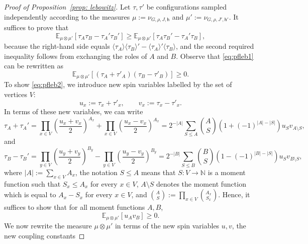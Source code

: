 \documentclass[10pt,a4paper]{amsart}
\begin{document}
\begin{proof}[Proof of Proposition~\textup{\ref{prop: lebowitz}}]
Let $\tau, \tau'$ be configurations sampled independently according to the measures $\mu:=\nu_{G,\rho,J,\mathsf{h}}$ and $\mu':=\nu_{G,\rho,J',\mathsf{h}'}$.
It suffices to prove that
\begin{equation}\label{eq:pfleb1}
\mathbb{E}_{\mu\otimes\mu'} [\tau_A\tau_B-\tau_A'\tau_B'] \ge \mathbb{E}_{\mu\otimes\mu'}[\tau_A\tau_B'-\tau_A'\tau_B],
\end{equation}
because the right-hand side equals $\langle \tau_A \rangle \langle\tau_B \rangle' - \langle \tau_A \rangle' \langle \tau_B \rangle$, and the second required inequality follows from exchanging the roles of $A$ and $B$.
Observe that \eqref{eq:pfleb1} can be rewritten as
\begin{equation}\label{eq:pfleb2}
\mathbb{E}_{\mu\otimes\mu'} [(\tau_A + \tau'_A)(\tau_B - \tau'_B)] \ge 0.
\end{equation}
To show \eqref{eq:pfleb2}, we introduce new spin variables labelled by the set of vertices $V$:
\begin{equation}
u_x := \tau_x + \tau'_x, \qquad v_x := \tau_x - \tau'_x.
\end{equation}
In terms of these new variables, we can write 
\begin{equation}
\tau_A+\tau_A' = \prod_{x\in V} \left(\frac{u_x+v_x}{2}\right)^{A_x} + \prod_{x\in V} \left(\frac{u_x-v_x}{2}\right)^{A_x}=2^{-|A|}\sum_{S\le A}\binom{A}{S}(1+(-1)^{|A|-|S|})u_S v_{A\setminus S},
\end{equation}
and
\begin{equation}
\tau_B-\tau_B' = \prod_{y\in V} \left(\frac{u_y+v_y}{2}\right)^{B_y} - \prod_{y\in V} \left(\frac{u_y-v_y}{2}\right)^{B_y}=
2^{-|B|}\sum_{S\le B}\binom{B}{S}(1-(-1)^{|B|-|S|})u_S v_{B\setminus S},
\end{equation}
where $|A|:=\sum_{x\in V} A_x$, the notation $S\le A$ means that $S:V \to\mathbb{N}$ is a moment function such that $S_x\le A_x$ for every $x\in V$, $A\setminus S$ denotes the moment function which is equal to $A_x- S_x$ for every $x\in V$, and $\binom{A}{S}:=\prod_{x\in V}\binom{A_x}{S_x}$.
Hence, it suffices to show that for all moment functions $A,B$,  
\begin{equation}\label{eq:what-we-need-to-prove}
\mathbb{E}_{\mu\otimes\mu'}[u_Av_B]\geq 0.
\end{equation}
We now rewrite the measure $\mu\otimes \mu'$ in terms of the new spin variables $u,v$, the new coupling constants 

\end{proof}
\end{document}

